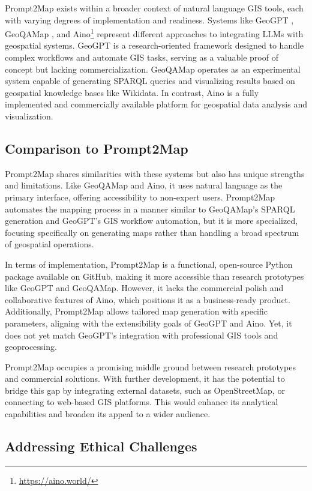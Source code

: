 Prompt2Map exists within a broader context of natural language GIS tools, each with varying degrees of implementation and readiness. Systems like GeoGPT \cite{kim_flex_2024}, GeoQAMap \cite{feng_geoqamap_2023}, and Aino\footnote{\url{https://aino.world/}} represent different approaches to integrating LLMs with geospatial systems. GeoGPT is a research-oriented framework designed to handle complex workflows and automate GIS tasks, serving as a valuable proof of concept but lacking commercialization. GeoQAMap  operates as an experimental system capable of generating SPARQL queries and visualizing results based on geospatial knowledge bases like Wikidata. In contrast, Aino is a fully implemented and commercially available platform for geospatial data analysis and visualization.

\subsection{Comparison to Prompt2Map}

Prompt2Map shares similarities with these systems but also has unique strengths and limitations. Like GeoQAMap and Aino, it uses natural language as the primary interface, offering accessibility to non-expert users. Prompt2Map automates the mapping process in a manner similar to GeoQAMap's SPARQL generation and GeoGPT's GIS workflow automation, but it is more specialized, focusing specifically on generating maps rather than handling a broad spectrum of geospatial operations.

In terms of implementation, Prompt2Map is a functional, open-source Python package available on GitHub, making it more accessible than research prototypes like GeoGPT and GeoQAMap. However, it lacks the commercial polish and collaborative features of Aino, which positions it as a business-ready product. Additionally, Prompt2Map allows tailored map generation with specific parameters, aligning with the extensibility goals of GeoGPT and Aino. Yet, it does not yet match GeoGPT's integration with professional GIS tools and geoprocessing.

Prompt2Map occupies a promising middle ground between research prototypes and commercial solutions. With further development, it has the potential to bridge this gap by integrating external datasets, such as OpenStreetMap, or connecting to web-based GIS platforms. This would enhance its analytical capabilities and broaden its appeal to a wider audience.
\subsection{Addressing Ethical Challenges}

